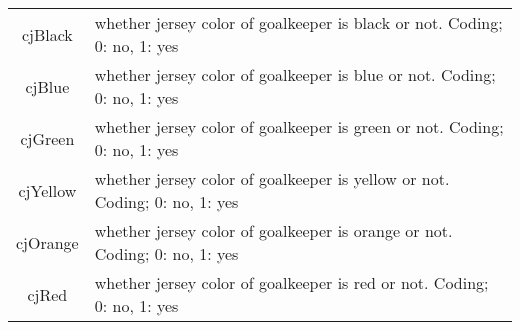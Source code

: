 \documentclass[12pt,dvipsnames]{article}%
\begin{document}
\begin{table}[h]
\begin{tabular}{ c | p{12cm}  }
cjBlack & whether jersey color of goalkeeper is black or not. Coding; 0: no, 1: yes \\

cjBlue & whether jersey color of goalkeeper is blue or not. Coding; 0: no, 1: yes \\

cjGreen & whether jersey color of goalkeeper is green or not. Coding; 0: no, 1: yes \\

cjYellow & whether jersey color of goalkeeper is yellow or not. Coding; 0: no, 1: yes \\

cjOrange & whether jersey color of goalkeeper is orange or not. Coding; 0: no, 1: yes \\

cjRed & whether jersey color of goalkeeper is red or not. Coding; 0: no, 1: yes \\


 \end{tabular}
 \end{table}
 
\pagebreak
 
\end{document}
